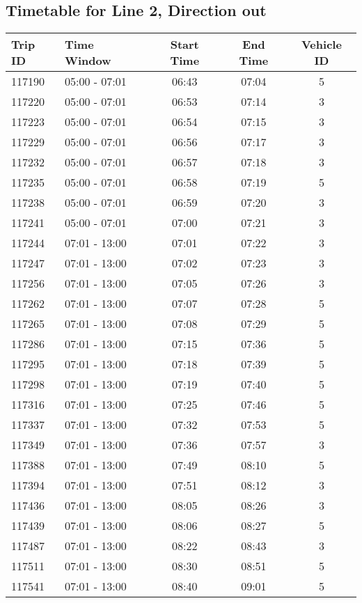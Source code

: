 \documentclass{article}
\begin{document}
\subsection*{Timetable for Line 2, Direction out}
\begin{tabular}{llccc}
\toprule
Trip ID & Time Window & Start Time & End Time & Vehicle ID \\
\midrule
117190 & 05:00 - 07:01 & 06:43 & 07:04 & 5 \\
117220 & 05:00 - 07:01 & 06:53 & 07:14 & 3 \\
117223 & 05:00 - 07:01 & 06:54 & 07:15 & 3 \\
117229 & 05:00 - 07:01 & 06:56 & 07:17 & 3 \\
117232 & 05:00 - 07:01 & 06:57 & 07:18 & 3 \\
117235 & 05:00 - 07:01 & 06:58 & 07:19 & 5 \\
117238 & 05:00 - 07:01 & 06:59 & 07:20 & 3 \\
117241 & 05:00 - 07:01 & 07:00 & 07:21 & 3 \\
117244 & 07:01 - 13:00 & 07:01 & 07:22 & 3 \\
117247 & 07:01 - 13:00 & 07:02 & 07:23 & 3 \\
117256 & 07:01 - 13:00 & 07:05 & 07:26 & 3 \\
117262 & 07:01 - 13:00 & 07:07 & 07:28 & 5 \\
117265 & 07:01 - 13:00 & 07:08 & 07:29 & 5 \\
117286 & 07:01 - 13:00 & 07:15 & 07:36 & 5 \\
117295 & 07:01 - 13:00 & 07:18 & 07:39 & 5 \\
117298 & 07:01 - 13:00 & 07:19 & 07:40 & 5 \\
117316 & 07:01 - 13:00 & 07:25 & 07:46 & 5 \\
117337 & 07:01 - 13:00 & 07:32 & 07:53 & 5 \\
117349 & 07:01 - 13:00 & 07:36 & 07:57 & 3 \\
117388 & 07:01 - 13:00 & 07:49 & 08:10 & 5 \\
117394 & 07:01 - 13:00 & 07:51 & 08:12 & 3 \\
117436 & 07:01 - 13:00 & 08:05 & 08:26 & 3 \\
117439 & 07:01 - 13:00 & 08:06 & 08:27 & 5 \\
117487 & 07:01 - 13:00 & 08:22 & 08:43 & 3 \\
117511 & 07:01 - 13:00 & 08:30 & 08:51 & 5 \\
117541 & 07:01 - 13:00 & 08:40 & 09:01 & 5 \\

\end{tabular}
\end{document}
